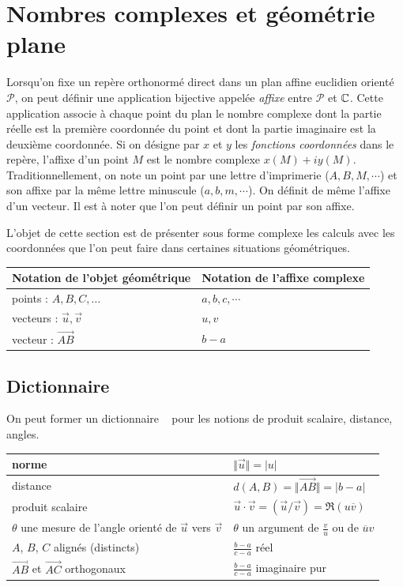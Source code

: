 \section{Nombres complexes et géométrie plane}\label{interpgeo}
Lorsqu'on fixe un repère orthonormé direct dans un plan affine euclidien orienté $\mathcal P$, on peut définir une application bijective appelée \emph{affixe} entre $\mathcal P$ et $\mathbb{C}$. Cette application associe à chaque point du plan le nombre complexe dont la partie réelle est la première coordonnée du point et dont la partie imaginaire est la deuxième coordonnée.\newline
Si on désigne par $x$ et $y$ les \emph{fonctions coordonnées} dans le repère, l'affixe d'un point $M$ est le nombre complexe $x(M)+iy(M)$. Traditionnellement, on note un point par une lettre d'imprimerie ($A, B, M, \cdots$) et son affixe par la même lettre minuscule ($a,b,m, \cdots$). On définit de même l'affixe d'un vecteur. Il est à noter que l'on peut définir un point par son affixe.

L'objet de cette section est de présenter sous forme complexe les calculs avec les coordonnées que l'on peut faire dans certaines situations géométriques.
\renewcommand{\arraystretch}{1.8}
\begin{center}
\begin{tabular}{|l|l|}
\hline
Notation de l'objet géométrique & Notation de l'affixe complexe\\ \hline
points : $A, B, C, \dots$ & $a,b,c, \cdots$\\ \hline
vecteurs : $\overrightarrow{u}, \overrightarrow{v}$ & $u, v$\\ \hline
vecteur : $\overrightarrow{AB}$ & $b-a$\\ \hline
\end{tabular}
\end{center}
\subsection{Dictionnaire}
On peut former un \og dictionnaire \fg~ pour les notions de produit scalaire, distance, angles.
\renewcommand{\arraystretch}{1.8}
\begin{center}
\begin{tabular}{|l|l|}
\hline
norme  & $\Vert \overrightarrow{u}\Vert = |u|$\\ \hline
distance & $d(A, B) = \Vert \overrightarrow{AB}\Vert = |b -a|$ \\ \hline
produit scalaire & $\overrightarrow{u}\cdot \overrightarrow{v}
=(\overrightarrow{u}/  \overrightarrow{v})=\Re(u\overline{v})$\\ \hline
$\theta$ une mesure de l'angle orienté de $\overrightarrow{u}$ vers $\overrightarrow{v}$ &
$\theta$ un argument de $\frac{v}{u}$ ou de $\overline{u}v$\\ \hline
$A$, $B$, $C$ alignés (distincts) & $\frac{b-a}{c-a}$ réel \\ \hline
$\overrightarrow{AB}$ et $\overrightarrow{AC}$ orthogonaux & $\frac{b-a}{c-a}$ imaginaire pur \\ \hline 
\end{tabular}
\end{center}

